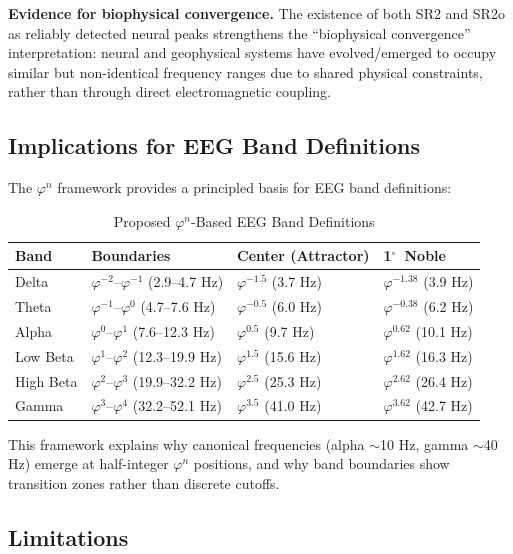 \documentclass[11pt,a4paper]{article}
\newcommand{\degree}{$^\circ$}  %
\newcommand{\phisym}{\varphi}
\begin{document}
\textbf{Evidence for biophysical convergence.} The existence of both SR2 and SR2o as reliably detected neural peaks strengthens the ``biophysical convergence'' interpretation: neural and geophysical systems have evolved/emerged to occupy similar but non-identical frequency ranges due to shared physical constraints, rather than through direct electromagnetic coupling.

\subsection{Implications for EEG Band Definitions}

The $\phisym^n$ framework provides a principled basis for EEG band definitions:

\begin{table}[H]
\centering
\caption{Proposed $\phisym^n$-Based EEG Band Definitions}
\label{tab:band_definitions}
\begin{tabular}{@{}llll@{}}
\toprule
Band & Boundaries & Center (Attractor) & 1\degree\ Noble \\
\midrule
Delta & $\phisym^{-2}$--$\phisym^{-1}$ (2.9--4.7 Hz) & $\phisym^{-1.5}$ (3.7 Hz) & $\phisym^{-1.38}$ (3.9 Hz) \\
Theta & $\phisym^{-1}$--$\phisym^{0}$ (4.7--7.6 Hz) & $\phisym^{-0.5}$ (6.0 Hz) & $\phisym^{-0.38}$ (6.2 Hz) \\
Alpha & $\phisym^{0}$--$\phisym^{1}$ (7.6--12.3 Hz) & $\phisym^{0.5}$ (9.7 Hz) & $\phisym^{0.62}$ (10.1 Hz) \\
Low Beta & $\phisym^{1}$--$\phisym^{2}$ (12.3--19.9 Hz) & $\phisym^{1.5}$ (15.6 Hz) & $\phisym^{1.62}$ (16.3 Hz) \\
High Beta & $\phisym^{2}$--$\phisym^{3}$ (19.9--32.2 Hz) & $\phisym^{2.5}$ (25.3 Hz) & $\phisym^{2.62}$ (26.4 Hz) \\
Gamma & $\phisym^{3}$--$\phisym^{4}$ (32.2--52.1 Hz) & $\phisym^{3.5}$ (41.0 Hz) & $\phisym^{3.62}$ (42.7 Hz) \\
\bottomrule
\end{tabular}
\end{table}

This framework explains why canonical frequencies (alpha $\sim$10 Hz, gamma $\sim$40 Hz) emerge at half-integer $\phisym^n$ positions, and why band boundaries show transition zones rather than discrete cutoffs.

\subsection{Limitations}
\end{document}
